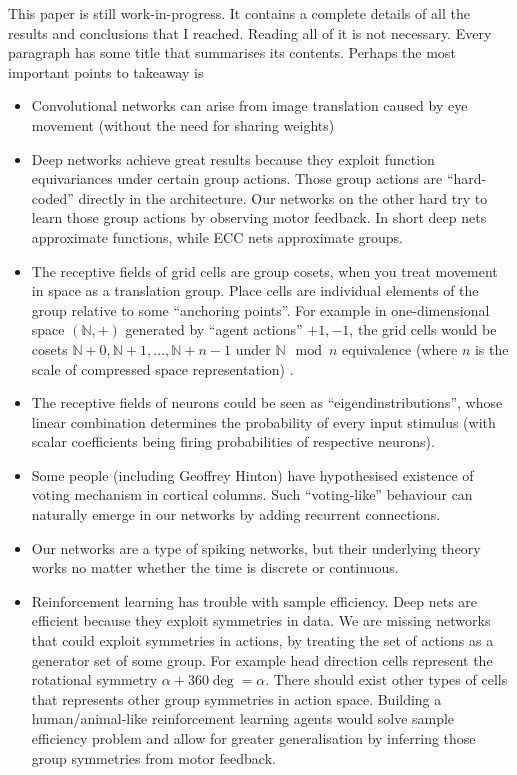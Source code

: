 \documentclass[12pt]{article}
\begin{document}
This paper is still work-in-progress. It contains a complete details of all the results and conclusions that I reached. Reading all of it is not necessary. Every paragraph has some title that summarises its contents. Perhaps the most important points to takeaway is 
\begin{itemize}
	\item Convolutional networks can arise from image translation caused by eye movement (without the need for sharing weights)
	\item Deep networks achieve great results because they exploit function equivariances under certain group actions. Those group actions are ``hard-coded'' directly in the architecture. Our networks on the other hard try to learn those group actions by observing motor feedback. In short deep nets approximate functions, while ECC nets approximate groups.
	\item The receptive fields of grid cells are group cosets, when you treat movement in space as a translation group. Place cells are individual elements of the group relative to some ``anchoring points''. For example in one-dimensional space $(\mathbb{N},+)$ generated by ``agent actions'' $+1,-1$, the grid cells would be cosets $\mathbb{N}+0,\mathbb{N}+1,...,\mathbb{N}+n-1$ under $\mathbb{N} \mod n$ equivalence (where $n$ is the scale of compressed space representation) .
	\item The receptive fields of neurons could be seen as ``eigendinstributions'', whose linear combination determines the probability of every input stimulus  (with scalar coefficients being firing probabilities of respective neurons).
	\item Some people (including Geoffrey Hinton) have hypothesised existence of voting mechanism in cortical columns. Such ``voting-like'' behaviour can naturally emerge in our networks by adding recurrent connections.
	\item Our networks are a type of spiking networks, but their underlying theory works no matter whether the time is discrete or continuous.
	\item Reinforcement learning has trouble with sample efficiency. Deep nets are efficient because they exploit symmetries in data. We are missing networks that could exploit symmetries in actions, by treating the set of actions as a generator set of some group. For example head direction cells represent the rotational symmetry  $\alpha + 360\deg = \alpha$. There should exist other types of cells that represents other group symmetries in action space. Building a human/animal-like reinforcement learning agents would solve sample efficiency problem and allow for greater generalisation by inferring those group symmetries from motor feedback.
\end{itemize}
\end{document}
